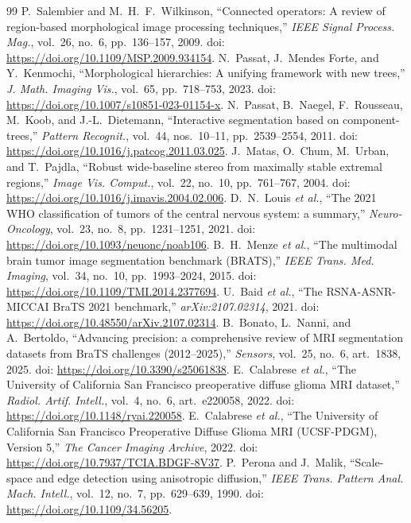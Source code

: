 \documentclass[11pt,a4paper]{article}
\begin{document}
\begin{thebibliography}{99}
 P.~Salembier and M.~H.~F.~Wilkinson, ``Connected operators: A review of region-based morphological image processing techniques,'' \emph{IEEE Signal Process. Mag.}, vol.~26, no.~6, pp.~136--157, 2009. doi: \url{https://doi.org/10.1109/MSP.2009.934154}.
 N.~Passat, J.~Mendes Forte, and Y.~Kenmochi, ``Morphological hierarchies: A unifying framework with new trees,'' \emph{J. Math. Imaging Vis.}, vol.~65, pp.~718--753, 2023. doi: \url{https://doi.org/10.1007/s10851-023-01154-x}.
 N.~Passat, B.~Naegel, F.~Rousseau, M.~Koob, and J.-L.~Dietemann, ``Interactive segmentation based on component-trees,'' \emph{Pattern Recognit.}, vol.~44, nos.~10--11, pp.~2539--2554, 2011. doi: \url{https://doi.org/10.1016/j.patcog.2011.03.025}.
 J.~Matas, O.~Chum, M.~Urban, and T.~Pajdla, ``Robust wide-baseline stereo from maximally stable extremal regions,'' \emph{Image Vis. Comput.}, vol.~22, no.~10, pp.~761--767, 2004. doi: \url{https://doi.org/10.1016/j.imavis.2004.02.006}.
 D.~N.~Louis \emph{et al.}, ``The 2021 WHO classification of tumors of the central nervous system: a summary,'' \emph{Neuro-Oncology}, vol.~23, no.~8, pp.~1231--1251, 2021. doi: \url{https://doi.org/10.1093/neuonc/noab106}.
 B.~H.~Menze \emph{et al.}, ``The multimodal brain tumor image segmentation benchmark (BRATS),'' \emph{IEEE Trans. Med. Imaging}, vol.~34, no.~10, pp.~1993--2024, 2015. doi: \url{https://doi.org/10.1109/TMI.2014.2377694}.
 U.~Baid \emph{et al.}, ``The RSNA-ASNR-MICCAI BraTS 2021 benchmark,'' \emph{arXiv:2107.02314}, 2021. doi: \url{https://doi.org/10.48550/arXiv.2107.02314}.
 B.~Bonato, L.~Nanni, and A.~Bertoldo, ``Advancing precision: a comprehensive review of MRI segmentation datasets from BraTS challenges (2012--2025),'' \emph{Sensors}, vol.~25, no.~6, art.~1838, 2025. doi: \url{https://doi.org/10.3390/s25061838}.
 E.~Calabrese \emph{et al.}, ``The University of California San Francisco preoperative diffuse glioma MRI dataset,'' \emph{Radiol. Artif. Intell.}, vol.~4, no.~6, art.~e220058, 2022. doi: \url{https://doi.org/10.1148/ryai.220058}.
 E.~Calabrese \emph{et al.}, ``The University of California San Francisco Preoperative Diffuse Glioma MRI (UCSF-PDGM), Version 5,'' \emph{The Cancer Imaging Archive}, 2022. doi: \url{https://doi.org/10.7937/TCIA.BDGF-8V37}.
 P.~Perona and J.~Malik, ``Scale-space and edge detection using anisotropic diffusion,'' \emph{IEEE Trans. Pattern Anal. Mach. Intell.}, vol.~12, no.~7, pp.~629--639, 1990. doi: \url{https://doi.org/10.1109/34.56205}.

\end{thebibliography}
\end{document}
